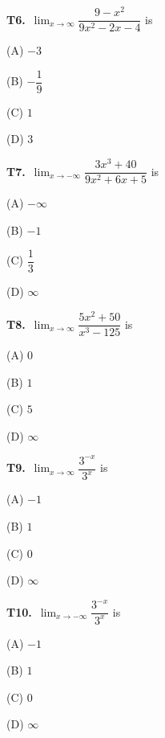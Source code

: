 \documentclass[11pt]{article}
\begin{document}
\bigskip\noindent\textbf{T6.}\ $\displaystyle\lim_{x\to\infty}\dfrac{9-x^2}{9x^2-2x-4}$ is
\begin{list}{}{\setlength{\leftmargin}{3em}\setlength{\labelwidth}{2.5em}\setlength{\itemsep}{0pt}\setlength{\topsep}{2pt}}
\item[(A)] $-3$
\item[(B)] $-\dfrac{1}{9}$
\item[(C)] $1$
\item[(D)] $3$
\end{list}

\bigskip\noindent\textbf{T7.}\ $\displaystyle\lim_{x\to-\infty}\dfrac{3x^3+40}{9x^2+6x+5}$ is
\begin{list}{}{\setlength{\leftmargin}{3em}\setlength{\labelwidth}{2.5em}\setlength{\itemsep}{0pt}\setlength{\topsep}{2pt}}
\item[(A)] $-\infty$
\item[(B)] $-1$
\item[(C)] $\dfrac{1}{3}$
\item[(D)] $\infty$
\end{list}

\bigskip\noindent\textbf{T8.}\ $\displaystyle\lim_{x\to\infty}\dfrac{5x^2+50}{x^3-125}$ is
\begin{list}{}{\setlength{\leftmargin}{3em}\setlength{\labelwidth}{2.5em}\setlength{\itemsep}{0pt}\setlength{\topsep}{2pt}}
\item[(A)] $0$
\item[(B)] $1$
\item[(C)] $5$
\item[(D)] $\infty$
\end{list}

\bigskip\noindent\textbf{T9.}\ $\displaystyle\lim_{x\to\infty}\dfrac{3^{-x}}{3^x}$ is
\begin{list}{}{\setlength{\leftmargin}{3em}\setlength{\labelwidth}{2.5em}\setlength{\itemsep}{0pt}\setlength{\topsep}{2pt}}
\item[(A)] $-1$
\item[(B)] $1$
\item[(C)] $0$
\item[(D)] $\infty$
\end{list}

\bigskip\noindent\textbf{T10.}\ $\displaystyle\lim_{x\to-\infty}\dfrac{3^{-x}}{3^x}$ is
\begin{list}{}{\setlength{\leftmargin}{3em}\setlength{\labelwidth}{2.5em}\setlength{\itemsep}{0pt}\setlength{\topsep}{2pt}}
\item[(A)] $-1$
\item[(B)] $1$
\item[(C)] $0$
\item[(D)] $\infty$
\end{list}
\end{document}
